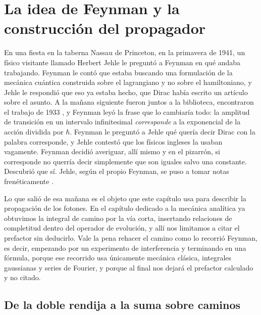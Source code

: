 \section{La idea de Feynman y la construcción del propagador}

    En una fiesta en la taberna Nassau de Princeton, en la primavera de 1941, un físico visitante llamado Herbert Jehle le preguntó a Feynman en qué andaba trabajando. Feynman le contó que estaba buscando una formulación de la mecánica cuántica construida sobre el lagrangiano y no sobre el hamiltoniano, y Jehle le respondió que eso ya estaba hecho, que Dirac había escrito un artículo sobre el asunto. A la mañana siguiente fueron juntos a la biblioteca, encontraron el trabajo de 1933 \citep{dirac1933lagrangian}, y Feynman leyó la frase que lo cambiaría todo: la amplitud de transición en un intervalo infinitesimal \textit{corresponde} a la exponencial de la acción dividida por $\hbar$. Feynman le preguntó a Jehle qué quería decir Dirac con la palabra corresponde, y Jehle contestó que los físicos ingleses la usaban vagamente. Feynman decidió averiguar, allí mismo y en el pizarrón, si corresponde no querría decir simplemente que son iguales salvo una constante. Descubrió que sí. Jehle, según el propio Feynman, se puso a tomar notas frenéticamente \citep{feynman1966development}.

    Lo que salió de esa mañana es el objeto que este capítulo usa para describir la propagación de los fotones. En el capítulo dedicado a la mecánica analítica ya obtuvimos la integral de camino por la vía corta, insertando relaciones de completitud dentro del operador de evolución, y allí nos limitamos a citar el prefactor sin deducirlo. Vale la pena rehacer el camino como lo recorrió Feynman, es decir, empezando por un experimento de interferencia y terminando en una fórmula, porque ese recorrido usa únicamente mecánica clásica, integrales gaussianas y series de Fourier, y porque al final nos dejará el prefactor calculado y no citado.

    \subsection{De la doble rendija a la suma sobre caminos}

